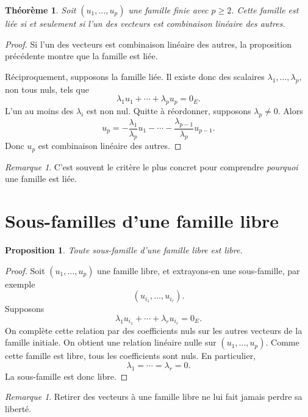 \documentclass[11pt,a4paper]{article}
\newtheorem{theoreme}[definition]{Théorème}
\newtheorem{proposition}[definition]{Proposition}
\theoremstyle{remark}
\newtheorem{remarque}[definition]{Remarque}
\begin{document}
\begin{theoreme}
Soit \((u_1,\dots,u_p)\) une famille finie avec \(p\ge 2\).  
Cette famille est liée si et seulement si l’un des vecteurs est combinaison linéaire des autres.
\end{theoreme}

\begin{proof}
Si l’un des vecteurs est combinaison linéaire des autres, la proposition précédente montre que la famille est liée.

Réciproquement, supposons la famille liée. Il existe donc des scalaires \(\lambda_1,\dots,\lambda_p\), non tous nuls, tels que
\[
\lambda_1u_1+\cdots+\lambda_pu_p=0_E.
\]
L’un au moins des \(\lambda_i\) est non nul. Quitte à réordonner, supposons \(\lambda_p\neq 0\). Alors
\[
u_p=-\frac{\lambda_1}{\lambda_p}u_1-\cdots-\frac{\lambda_{p-1}}{\lambda_p}u_{p-1}.
\]
Donc \(u_p\) est combinaison linéaire des autres.
\end{proof}

\begin{remarque}
C’est souvent le critère le plus concret pour comprendre \emph{pourquoi} une famille est liée.
\end{remarque}

\section{Sous-familles d’une famille libre}

\begin{proposition}
Toute sous-famille d’une famille libre est libre.
\end{proposition}

\begin{proof}
Soit \((u_1,\dots,u_p)\) une famille libre, et extrayons-en une sous-famille, par exemple
\[
(u_{i_1},\dots,u_{i_r}).
\]
Supposons
\[
\lambda_1u_{i_1}+\cdots+\lambda_ru_{i_r}=0_E.
\]
On complète cette relation par des coefficients nuls sur les autres vecteurs de la famille initiale. On obtient une relation linéaire nulle sur \((u_1,\dots,u_p)\). Comme cette famille est libre, tous les coefficients sont nuls. En particulier,
\[
\lambda_1=\cdots=\lambda_r=0.
\]
La sous-famille est donc libre.
\end{proof}

\begin{remarque}
Retirer des vecteurs à une famille libre ne lui fait jamais perdre sa liberté.
\end{remarque}
\end{document}
